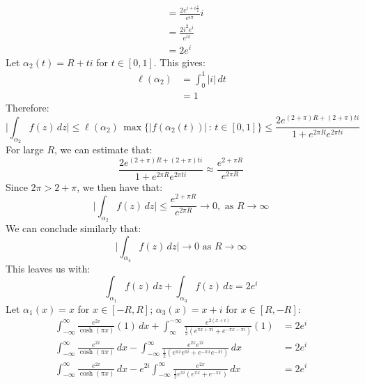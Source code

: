 \documentclass[letterpaper, titlepage, DIV=14]{scrartcl}
\begin{document}
\begin{enumerate}[i)]
\begin{align*}
        &= \frac{2e^{i+i\frac{\pi}{2}}}{e^{i\pi}} i \\
        &= \frac{2i^{2}e^{i}}{e^{i\pi}} \\
        &= 2e^{i}
    \end{align*}
    Let $\alpha_{2}(t) = R + ti$ for $t\in[0,1]$. This gives:
    \begin{align*}
      \ell(\alpha_{2}) &= \int_{0}^{1} |i| \, dt \\
        &= 1
    \end{align*}
    Therefore:
    \begin{equation*}
      \Big|\int_{\alpha_{2}} f(z) \, dz \Big| \leq \ell(\alpha_{2}) \, \max\{|f(\alpha_{2}(t))| \, : \, t\in[0,1]\} \leq \frac{2e^{(2+\pi)R + (2+\pi)ti}}{1+e^{2\pi R}e^{2\pi ti}}
    \end{equation*}
    For large $R$, we can estimate that:
    \begin{equation*}
      \frac{2e^{(2+\pi)R + (2+\pi)ti}}{1+e^{2\pi R}e^{2\pi ti}} \approx \frac{e^{2+\pi R}}{e^{2\pi R}}
    \end{equation*}
    Since $2\pi > 2+\pi$, we then have that:
    \begin{equation*}
      \Big|\int_{\alpha_{2}} f(z) \, dz \Big| \leq \frac{e^{2+\pi R}}{e^{2\pi R}} \to 0, \text{ as } R\to\infty
    \end{equation*}
    We can conclude similarly that:
    \begin{equation*}
      \Big|\int_{\alpha_{4}} f(z) \, dz \Big| \to 0 \text{ as } R\to\infty
    \end{equation*}
    This leaves us with:
    \begin{equation*}
      \int_{\alpha_{1}} f(z) \, dz + \int_{\alpha_{3}} f(z) \, dz = 2e^{i}
    \end{equation*}
    Let $\alpha_{1}(x)=x$ for $x\in[-R,R]$; $\alpha_{3}(x)=x + i$ for $x\in[R,-R]$:
    \begin{align*}
      \int_{-\infty}^{\infty} \frac{e^{2x}}{\cosh(\pi x)} (1) \, dx + \int_{\infty}^{-\infty} \frac{e^{2(x+i)}}{\frac{1}{2}(e^{\pi x+\pi i}+e^{-\pi x-\pi i})}(1) &= 2e^{i} \\
      \int_{-\infty}^{\infty} \frac{e^{2x}}{\cosh(\pi x)} \, dx - \int_{-\infty}^{\infty} \frac{e^{2x}e^{2i}}{\frac{1}{2}(e^{\pi x}e^{\pi i}+e^{-\pi x}e^{-\pi i})} \, dx &= 2e^{i} \\
      \int_{-\infty}^{\infty} \frac{e^{2x}}{\cosh(\pi x)} \, dx - e^{2i}\int_{-\infty}^{\infty} \frac{e^{2x}}{\frac{1}{2}e^{\pi i}(e^{\pi x}+e^{-\pi x})} \, dx &= 2e^{i} 

\end{align*}
\end{enumerate}
\end{document}
